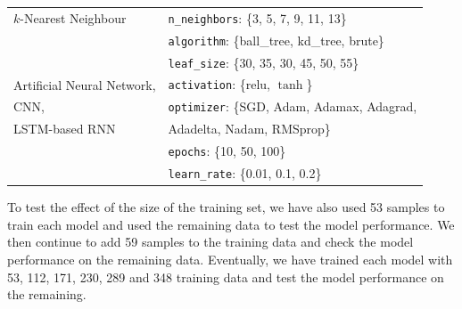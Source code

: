 \begin{table}[t]
\begin{tabular}{ll}
$k$-Nearest Neighbour & \texttt{n\_neighbors}: \{3, 5, 7, 9, 11, 13\}\\
& \texttt{algorithm}: \{ball\_tree, kd\_tree, brute\}\\
& \texttt{leaf\_size}: \{30, 35, 30, 45, 50, 55\}\\
\midrule
Artificial Neural Network, & \texttt{activation}: \{relu, $\tanh$\}\\
CNN, & \texttt{optimizer}: \{SGD, Adam, Adamax, Adagrad,\\
LSTM-based RNN & Adadelta, Nadam, RMSprop\}\\
& \texttt{epochs}: \{10, 50, 100\}\\
& \texttt{learn\_rate}: \{0.01, 0.1, 0.2\}\\
\bottomrule
\end{tabular}
\end{table}

To test the effect of the size of the training set, we have also used 53 samples to train each model and used the remaining data to test the model performance. We then continue to add 59 samples to the training data and check the model performance on the remaining data. Eventually, we have trained each model with 53, 112, 171, 230, 289 and 348 training data and test the model performance on the remaining. 

